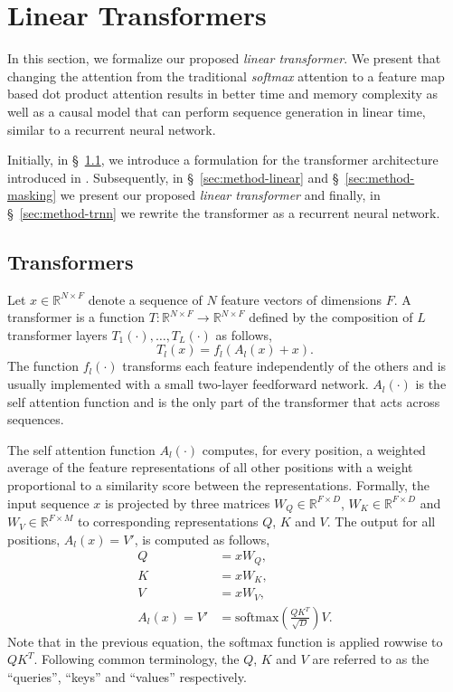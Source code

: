 \documentclass{article}
\newcommand{\linear}{\emph{linear transformer}}
\newcommand{\R}[1]{\mathbb{R}^{#1}}
\newcommand{\softmax}[1]{\text{softmax}\left(#1\right)}
\begin{document}
\section{Linear Transformers}

In this section, we formalize our proposed \linear{}. We present
that changing the attention from the traditional \emph{softmax} attention to a
feature map based dot product attention results in better time and memory
complexity as well as a causal model that can perform sequence generation in
linear time, similar to a recurrent neural network.

Initially, in \S~\ref{sec:method-intro}, we introduce a formulation for the
transformer architecture introduced in \cite{vaswani_attn}. Subsequently, in
\S~\ref{sec:method-linear} and \S~\ref{sec:method-masking} we present our
proposed \linear{} and finally, in \S~\ref{sec:method-trnn} we rewrite the
transformer as a recurrent neural network.

\subsection{Transformers} \label{sec:method-intro}


Let $x \in \R{N \times F}$ denote a sequence of $N$ feature vectors of dimensions
$F$. A transformer is a function $T : \R{N \times F} \to \R{N \times F}$
defined by the composition of $L$ transformer layers $T_1(\cdot), \dots,
T_L(\cdot)$ as follows,
\begin{equation}
    T_l(x) = f_l(A_l(x) + x).
    \label{eq:transformer}
\end{equation}
The function $f_l(\cdot)$ transforms each feature independently of the others
and is usually implemented with a small two-layer feedforward network. $A_l(\cdot)$ is the self
attention function and is the only part of the transformer that acts across
sequences.

The self attention function $A_l(\cdot)$ computes, for every position, a
weighted average of the feature representations of all other positions with a
weight proportional to a similarity score between the representations.
Formally, the input sequence $x$ is projected by three matrices $W_Q \in \R{F
\times D}$, $W_K \in \R{F \times D}$ and $W_V \in \R{F \times M}$ to
corresponding representations $Q$, $K$ and $V$. The output for all
positions, $A_l(x) = V'$, is computed as follows,
\begin{equation}
\begin{aligned}
    Q &= x W_Q, \\
    K &= x W_K,  \\
    V &= x W_V, \\
    A_l(x) = V' &= \softmax{\frac{Q K^T}{\sqrt{D}}} V.
    \label{eq:attn}
\end{aligned}
\end{equation}
Note that in the previous equation, the softmax function is applied rowwise to
$Q K^T$. Following common terminology, the $Q$, $K$ and $V$ are referred to
as the ``queries'', ``keys'' and ``values'' respectively.
\end{document}
